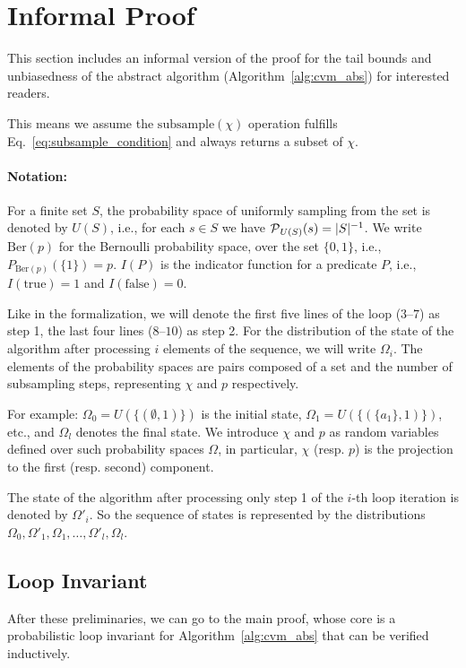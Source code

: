 \section{Informal Proof\label{apx:informal_proof}}
This section includes an informal version of the proof for the tail bounds and unbiasedness
of the abstract algorithm (Algorithm~\ref{alg:cvm_abs}) for interested readers.

This means we assume the $\mathrm{subsample}(\chi)$ operation fulfills
Eq.~\ref{eq:subsample_condition} and always returns a subset of $\chi$.

\paragraph{Notation:} For a finite set $S$, the probability space of uniformly sampling from the set
is denoted by $U(S)$, i.e., for each $s \in S$ we have $\operatorname{\mathcal P}_{U(S)}({s}) = |S|^{-1}$.
We write $\mathrm{Ber}(p)$ for the Bernoulli probability space, over the set $\{0,1\}$, i.e.,
$P_{\mathrm{Ber}(p)}(\{1\}) = p$. $I(P)$ is the indicator function for a predicate $P$, i.e.,
$I(\mathrm{true}) = 1$ and $I(\mathrm{false}) = 0$.

Like in the formalization, we will denote the first five lines of the loop ($3$--$7$) as step 1,
the last four lines ($8$--$10$) as step 2. For the distribution of the state of the algorithm after
processing $i$ elements of the sequence, we will write $\Omega_i$.
The elements of the probability spaces are pairs composed of a set and the number of subsampling
steps, representing $\chi$ and $p$ respectively.

For example: $\Omega_0 = U(\{(\emptyset, 1)\})$ is the initial state,
$\Omega_1 = U(\{(\{a_1\}, 1)\})$, etc., and $\Omega_l$ denotes the final state.
We introduce $\chi$ and $p$ as random variables defined over such probability spaces $\Omega$,
in particular, $\chi$ (resp. $p$) is the projection to the first (resp. second) component.

The state of the algorithm after processing only step 1 of the $i$-th loop iteration is denoted by
$\Omega'_i$. So the sequence of states is represented by the distributions
$\Omega_0, \Omega'_1, \Omega_1, \ldots, \Omega'_l, \Omega_l$.

\subsection{Loop Invariant}
After these preliminaries, we can go to the main proof, whose core is a probabilistic loop
invariant for Algorithm~\ref{alg:cvm_abs} that can be verified inductively.

